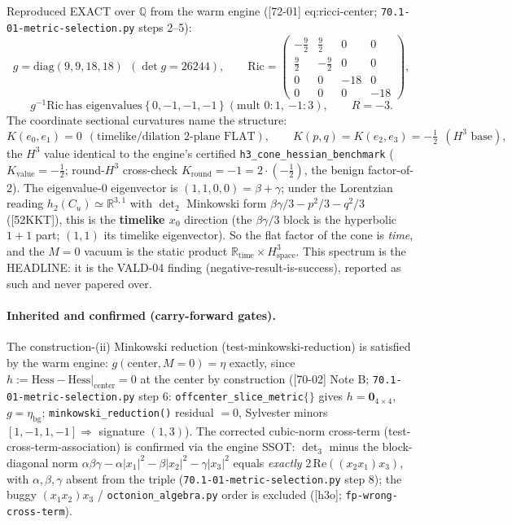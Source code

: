 Reproduced EXACT over $\mathbb{Q}$ from the warm engine ([72-01] eq:ricci-center;
\texttt{70.1-01-metric-selection.py} steps 2--5):
\begin{equation}
  g = \mathrm{diag}(9,9,18,18)\ \ (\det g = 26244),\qquad
  \mathrm{Ric} =
  \begin{pmatrix} -\tfrac92 & \tfrac92 & 0 & 0\\
                  \tfrac92 & -\tfrac92 & 0 & 0\\
                  0 & 0 & -18 & 0\\
                  0 & 0 & 0 & -18\end{pmatrix},
  \label{eq701:ricci-center}
\end{equation}
\begin{equation}
  g^{-1}\mathrm{Ric}\ \text{has eigenvalues}\ \{\,0,-1,-1,-1\,\}\
  (\text{mult } 0{:}1,\ {-1}{:}3),\qquad R = -3.
  \label{eq701:spectrum}
\end{equation}
The coordinate sectional curvatures name the structure:
\begin{equation}
  K(e_0,e_1) = 0\ \ (\text{timelike/dilation 2-plane FLAT}),\qquad
  K(p,q) = K(e_2,e_3) = -\tfrac12\ \ (\text{$H^3$ base}),
  \label{eq701:sectional}
\end{equation}
the $H^3$ value identical to the engine's certified
\texttt{h3\_cone\_hessian\_benchmark} ($K_{\text{value}}=-\tfrac12$; round-$H^3$
cross-check $K_{\text{round}}=-1=2\cdot(-\tfrac12)$, the benign factor-of-$2$). The
eigenvalue-$0$ eigenvector is $(1,1,0,0)=\beta+\gamma$; under the Lorentzian reading
$h_2(C_u)\simeq\mathbb{R}^{3,1}$ with $\det_2$ Minkowski form
$\beta\gamma/3-p^2/3-q^2/3$ ([52KKT]), this is the \textbf{timelike $x_0$} direction (the
$\beta\gamma/3$ block is the hyperbolic $1{+}1$ part; $(1,1)$ its timelike eigenvector).
So the flat factor of the cone is \emph{time}, and the $M=0$ vacuum is the static product
$\mathbb{R}_{\text{time}}\times H^3_{\text{space}}$. This spectrum is the HEADLINE: it is
the VALD-04 finding (negative-result-is-success), reported as such and never papered over.

\paragraph{Inherited and confirmed (carry-forward gates).} The construction-(ii)
Minkowski reduction (test-minkowski-reduction) is satisfied by the warm engine:
$g(\text{center},M{=}0)=\eta$ exactly, since $h:=\mathrm{Hess}-\mathrm{Hess}|_{\text{center}}=0$
at the center by construction ([70-02] Note B; \texttt{70.1-01-metric-selection.py}
step 6: \texttt{offcenter\_slice\_metric}$\{\}$ gives $h=\mathbf{0}_{4\times4}$,
$g=\eta_{\mathrm{bg}}$; \texttt{minkowski\_reduction()} residual $=0$, Sylvester minors
$[1,-1,1,-1]\Rightarrow$ signature $(1,3)$). The corrected cubic-norm cross-term
(test-cross-term-association) is confirmed via the engine SSOT: $\det_3$ minus the
block-diagonal norm $\alpha\beta\gamma-\alpha|x_1|^2-\beta|x_2|^2-\gamma|x_3|^2$ equals
\emph{exactly} $2\,\mathrm{Re}((x_2 x_1)x_3)$, with $\alpha,\beta,\gamma$ absent from the
triple (\texttt{70.1-01-metric-selection.py} step 8); the buggy $(x_1 x_2)x_3$ /
\texttt{octonion\_algebra.py} order is excluded ([h3o]; \texttt{fp-wrong-cross-term}).

